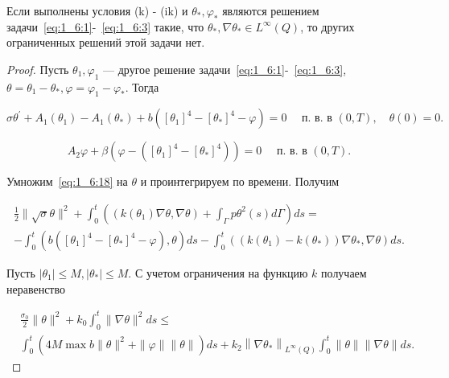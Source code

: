\begin{theorem}
    \label{th:1_6:2}
    Если выполнены условия (k) - (ik) и $\theta_{*}, \varphi_{*}$ являются
    решением задачи~\eqref{eq:1_6:1}-~\eqref{eq:1_6:3}
    такие, что $\theta_{*}, \nabla \theta_{*} \in L^{\infty}(Q)$,
    то других ограниченных решений этой задачи нет.
\end{theorem}

\begin{proof}
    Пусть $\theta_{1}, \varphi_{1}$ — другое решение задачи~\eqref{eq:1_6:1}-~\eqref{eq:1_6:3},
    $\theta=\theta_{1}-\theta_{*}, \varphi=\varphi_{1}-\varphi_{*}$.
    Тогда

    \begin{equation}
        \label{eq:1_6:18}
        \sigma \theta^{\prime}+A_{1}\left(\theta_{1}\right)-A_{1}\left(\theta_{*}\right)
        +b\left(\left[\theta_{1}\right]^{4}-\left[\theta_{*}\right]^{4}-\varphi\right)
        =0 \quad \text { п. в. в }(0, T), \quad \theta(0)=0.
    \end{equation}


    \begin{equation}
        \label{eq:1_6:19}
        A_{2} \varphi+\beta\left(\varphi
        -\left(\left[\theta_{1}\right]^{4}
        -\left[\theta_{*}\right]^{4}\right)\right)
        =0 \quad \text { п. в. в }(0, T).
    \end{equation}

    Умножим~\eqref{eq:1_6:18} на $\theta$ и проинтегрируем по времени.
    Получим

    \[
        \begin{gathered}
            \frac{1}{2}\|\sqrt{\sigma} \theta\|^{2}
            +\int_{0}^{t}\left(\left(k\left(\theta_{1}\right) \nabla \theta,
            \nabla \theta\right)+\int_{\Gamma} p \theta^{2}(s) d \Gamma\right) ds= \\
            -\int_{0}^{t}\left(b\left(\left[\theta_{1}\right]^{4}
            -\left[\theta_{*}\right]^{4}-\varphi\right), \theta\right) ds
            -\int_{0}^{t}\left(\left(k\left(\theta_{1}\right)
            -k\left(\theta_{*}\right)\right) \nabla \theta_{*}, \nabla \theta\right) ds.
        \end{gathered}
    \]


    Пусть $\left|\theta_{1}\right| \leq M,\left|\theta_{*}\right| \leq M$.
    С учетом ограничения на функцию $k$ получаем неравенство

    \begin{equation}
        \label{eq:1_6:20}
        \begin{aligned}
            &\frac{\sigma_{0}}{2}\|\theta\|^{2}+k_{0} \int_{0}^{t}\|\nabla \theta\|^{2} d s \leq \\
            & \int_{0}^{t}\left(4 M \max b\|\theta\|^{2}+\|\varphi\|\|\theta\|\right) d s
            +k_{2}\left\|\nabla \theta_{*}\right\|_{L^{\infty}(Q)} \int_{0}^{t}\|\theta\|\|\nabla \theta\| d s.
        \end{aligned}
    \end{equation}


\end{proof}
